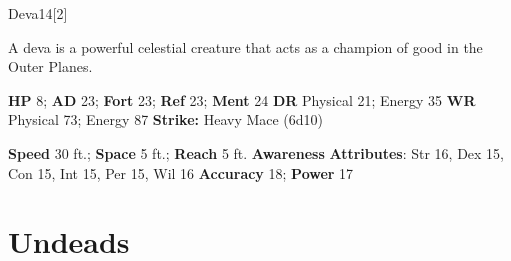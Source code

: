   \begin{monsection}{Deva}{14}[2]
    \vspace{-1em}\vspace{-1em}
    \vspace{0em}

    
      A deva is a powerful celestial creature that acts as a champion of good in the Outer Planes.
    

    \begin{spellcontent}
      \begin{spelltargetinginfo}
        \pari \textbf{HP} 8;
          \textbf{AD} 23;
          \textbf{Fort} 23;
          \textbf{Ref} 23;
          \textbf{Ment} 24
        \pari \textbf{DR} Physical 21; Energy 35
        \pari \textbf{WR} Physical 73; Energy 87
        \pari \textbf{Strike:}
            Heavy Mace  (6d10)
      \end{spelltargetinginfo}
    \end{spellcontent}
    \begin{monsterfooter}
      \pari \textbf{Speed} 30 ft.;
        \textbf{Space} 5 ft.;
        \textbf{Reach} 5 ft.
      \pari \textbf{Awareness} 
      \pari \textbf{Attributes}:
        Str 16, Dex 15,
        Con 15, Int 15,
        Per 15, Wil 16
      \pari \textbf{Accuracy} 18;
        \textbf{Power} 17
    \end{monsterfooter}
  \end{monsection}
  
  
        \section{Undeads}
      
